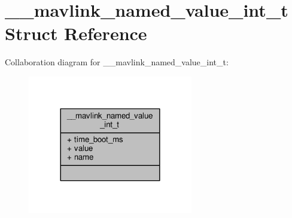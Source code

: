 \hypertarget{struct____mavlink__named__value__int__t}{\section{\+\_\+\+\_\+mavlink\+\_\+named\+\_\+value\+\_\+int\+\_\+t Struct Reference}
\label{struct____mavlink__named__value__int__t}
}


Collaboration diagram for \+\_\+\+\_\+mavlink\+\_\+named\+\_\+value\+\_\+int\+\_\+t\+:
\nopagebreak
\begin{figure}[H]
\begin{center}
\leavevmode
\includegraphics[width=204pt]{struct____mavlink__named__value__int__t__coll__graph}
\end{center}
\end{figure}
